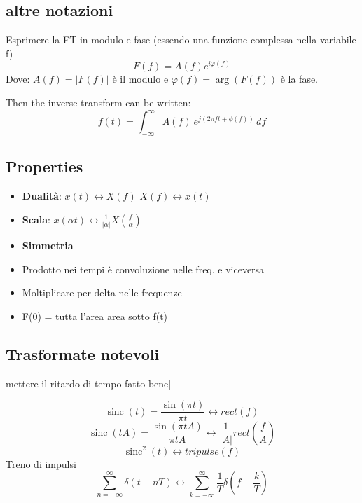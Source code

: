 \documentclass[12pt,a4paper,]{article}
\begin{document}
\subsection{altre notazioni}
Esprimere la FT in modulo e fase (essendo una funzione complessa nella variabile f)
\begin{equation}
 F(f) = A(f) e^{i\varphi(f)}
\end{equation}
Dove:  $A(f) = \left| F(f)\right|$ è il modulo e $\varphi (f) = \arg \left( F(f) \right)$ è la fase. 


Then the inverse transform can be written:
\begin{equation}
f(t) = \int _{-\infty}^\infty A(f)\ e^{ j\left(2\pi f t +\phi (f)\right)}\,df
\end{equation}



\subsection{Properties}
 \begin{itemize}
 \item  \textbf{Dualità}: $ x(t) \longleftrightarrow X(f)$ $ X(f)\longleftrightarrow x(t)$
 \item \textbf{Scala}: $ x(\alpha t)  \longleftrightarrow \frac{1}{|\alpha|}X(\frac{f}{\alpha})$
 \item \textbf{Simmetria}
 \item Prodotto nei tempi è convoluzione nelle freq. e viceversa
 \item Moltiplicare per delta nelle frequenze 
 \item F(0) = tutta l'area  area sotto f(t)
  \end{itemize}
 \subsection{Trasformate notevoli}
 mettere il ritardo di tempo fatto bene|
 
 \begin{equation}
 \operatorname{sinc}(t) = \frac{\sin(\pi t)}{\pi t}  \longleftrightarrow  rect(f) 
  \end{equation}
   \begin{equation}
 \operatorname{sinc}(tA) =  \frac{\sin(\pi tA)}{\pi tA}  \longleftrightarrow  \frac{1}{|A|} rect\left(\frac{f}{A}\right)
 \end{equation}
  \begin{equation}
 \operatorname{sinc}^{2}(t)   \longleftrightarrow  tripulse(f)
  \end{equation}
 Treno di impulsi
 \begin{equation}
  \sum_{n=-\infty}^{\infty}  \delta(t-nT) \longleftrightarrow  \sum_{k=-\infty}^{\infty}  \frac{1}{T} \delta \left(f-\frac{k}{T}\right)
 \end{equation}
 
\end{document}
